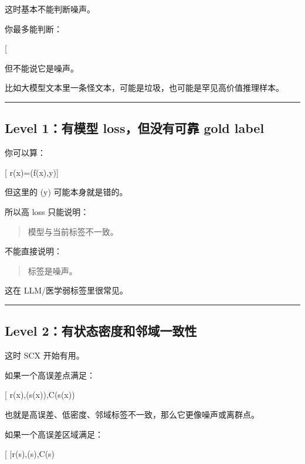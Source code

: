 \documentclass[
  12pt,
]{ctexart}
\begin{document}
这时基本不能判断噪声。

你最多能判断：

{[} \text{outlier / duplicate / low-density / high-density}{]}

但不能说它是噪声。

比如大模型文本里一条怪文本，可能是垃圾，也可能是罕见高价值推理样本。

\begin{center}\rule{0.5\linewidth}{0.5pt}\end{center}

\subsection{Level 1：有模型 loss，但没有可靠 gold
label}\label{level-1ux6709ux6a21ux578b-lossux4f46ux6ca1ux6709ux53efux9760-gold-label}

你可以算：

{[} r(x)=\ell(f(x),y){]}

但这里的 (y) 可能本身就是错的。

所以高 loss 只能说明：

\begin{quote}
模型与当前标签不一致。
\end{quote}

不能直接说明：

\begin{quote}
标签是噪声。
\end{quote}

这在 LLM/医学弱标签里很常见。

\begin{center}\rule{0.5\linewidth}{0.5pt}\end{center}

\subsection{Level
2：有状态密度和邻域一致性}\label{level-2ux6709ux72b6ux6001ux5bc6ux5ea6ux548cux90bbux57dfux4e00ux81f4ux6027}

这时 SCX 开始有用。

如果一个高误差点满足：

{[} r(x)\uparrow,\quad \rho(s(x))\downarrow,\quad C(s(x))\downarrow{]}

也就是高误差、低密度、邻域标签不一致，那么它更像噪声或离群点。

如果一个高误差区域满足：

{[} \bar r(s)\uparrow,\quad \rho(s)\uparrow,\quad C(s)\uparrow{]}
\end{document}
